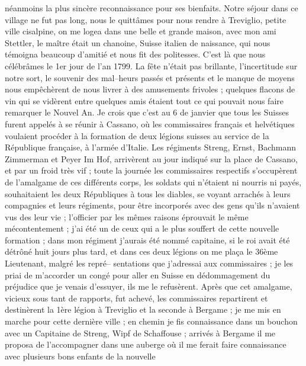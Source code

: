 \documentclass[12pt]{article}
\begin{document}
 néanmoins la plus sincère reconnaissance pour ses
bienfaits. Notre séjour dans ce village ne fut pas long, nous le quittâmes pour nous rendre à
Treviglio, petite ville cisalpine, on me logea dans une belle et grande maison, avec mon ami
Stettler, le maître était un chanoine, Suisse italien de naissance, qui nous témoigna beaucoup
d’amitié et nous fit des politesses. C’est là que nous célébrâmes le 1er jour de l’an 1799. La fête
n’était pas brillante, l’incertitude sur notre sort, le souvenir des mal–heurs passés et présents et
le manque de moyens nous empêchèrent de nous livrer à des amusements frivoles ; quelques flacons de
vin qui se vidèrent entre quelques amis étaient tout ce qui pouvait nous faire remarquer le Nouvel
An. Je crois que c’est au 6 de janvier que tous les Suisses furent appelés à se réunir à Cassano, où
les commissaires français et helvétiques voulaient procéder à la formation de deux légions suisses
au service de la République française, à l’armée d’Italie. Les régiments Streng, Ernst, Bachmann
Zimmerman et Peyer Im Hof, arrivèrent au jour indiqué sur la place de Cassano, et par un froid très
vif ; toute la journée les commissaires respectifs s’occupèrent de l’amalgame de ces différents
corps, les soldats qui n’étaient ni nourris ni payés, souhaitaient les deux Républiques à tous les
diables, se voyant arrachés à leurs compagnies et leurs régiments, pour être incorporés avec des
gens qu’ils n’avaient vus des leur vie ; l’officier par les mêmes raisons éprouvait le même
mécontentement ; j’ai été un de ceux qui a le plus souffert de cette nouvelle formation ; dans mon
régiment j’aurais été nommé capitaine, si le roi avait été détrôné huit jours plus tard, et dans ces
deux légions on me plaça le 36ème Lieutenant, malgré les repré– sentations que j’adressai aux
commissaires ; je les priai de m’accorder un congé pour aller en Suisse en dédommagement du
préjudice que je venais d’essuyer, ils me le refusèrent. Après que cet amalgame, vicieux sous tant
de rapports, fut achevé, les commissaires repartirent et destinèrent la 1ère légion à Treviglio et
la seconde à Bergame ; je me mis en marche pour cette dernière ville ; en chemin je fis connaissance
dans un bouchon avec un Capitaine de Streng, Wipf de Schaffouse ; arrivés à Bergame il me proposa de
l’accompagner dans une auberge où il me ferait faire connaissance avec plusieurs bons enfants de la
nouvelle
\end{document}
